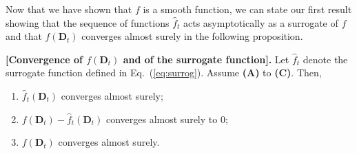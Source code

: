 \documentclass[twoside,11pt]{article}
\def\hatf{{ \hat f}}
\def\D{{\mathbf D}}
\def\hatf{{ \hat f}}
\begin{document}
Now that we have shown that $f$ is a smooth function, we can state our first result showing that the sequence of functions $\hatf_t$ acts asymptotically as a surrogate of $f$ and that $f(\D_t)$ converges almost surely in the following proposition.
\begin{proposition}{\bf [Convergence of $f(\D_t)$ and of the
surrogate function].} \label{prop:conv1}
Let $\hatf_t$ denote the surrogate function defined in Eq.~(\ref{eq:surrog}).
Assume {\bf (A)} to {\bf (C)}. Then,
\begin{enumerate}
   \item $\hatf_t(\D_t)$  converges almost surely;
   \item $f(\D_t)-\hatf_t(\D_t)$ converges almost surely to $0$; 
   \item $f(\D_t)$ converges almost surely.
\end{enumerate}
\end{proposition}
\end{document}
